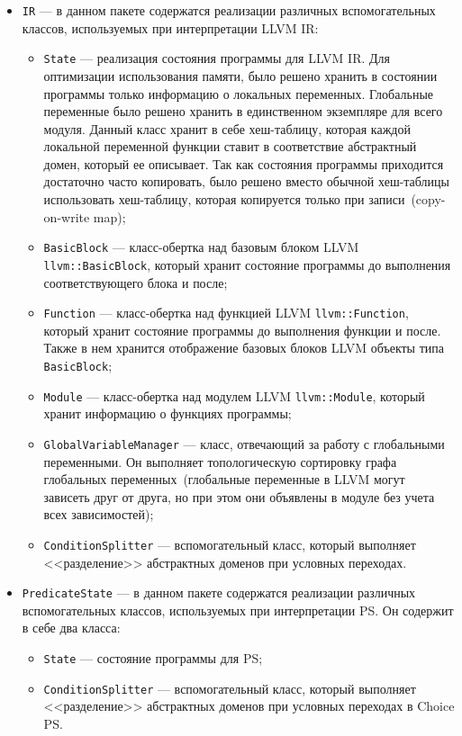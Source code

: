\begin{itemize}
\item \texttt{IR} --- в данном пакете содержатся реализации различных 
вспомогательных классов, используемых при интерпретации LLVM IR:
    \begin{itemize}
    \item \texttt{State} --- реализация состояния программы для LLVM IR. Для 
    оптимизации использования памяти, было решено хранить в состоянии 
    программы только информацию о локальных переменных. Глобальные переменные 
    было решено хранить в единственном экземпляре для всего модуля. Данный 
    класс хранит в себе хеш-таблицу, которая каждой локальной переменной 
    функции ставит в соответствие абстрактный домен, который ее описывает. Так 
    как состояния программы приходится достаточно часто копировать, было решено 
    вместо обычной хеш-таблицы использовать хеш-таблицу, которая копируется 
    только при записи~(copy-on-write map);
    \item \texttt{BasicBlock} --- класс-обертка над базовым блоком LLVM
    \texttt{llvm::BasicBlock}, который хранит состояние программы до
    выполнения соответствующего блока и после;
    \item \texttt{Function} --- класс-обертка над функцией LLVM
    \texttt{llvm::Function}, который хранит состояние программы до 
    выполнения функции и после. Также в нем хранится отображение базовых блоков
    LLVM объекты типа \texttt{BasicBlock};
    \item \texttt{Module} --- класс-обертка над модулем LLVM
    \texttt{llvm::Module}, который хранит информацию о функциях 
    программы;
    \item \texttt{GlobalVariableManager} --- класс, отвечающий за работу с 
    глобальными переменными. Он выполняет топологическую сортировку графа
    глобальных переменных~(глобальные переменные в LLVM могут зависеть друг от
    друга, но при этом они объявлены в модуле без учета всех зависимостей);
    \item \texttt{ConditionSplitter} --- вспомогательный класс, который 
    выполняет <<разделение>> абстрактных доменов при условных переходах.
    \end{itemize}
\item \texttt{PredicateState} --- в данном пакете содержатся реализации 
различных вспомогательных классов, используемых при интерпретации PS. Он 
содержит в себе два класса:
    \begin{itemize}
    \item \texttt{State} --- состояние программы для PS;
    \item \texttt{ConditionSplitter} --- вспомогательный класс, который 
    выполняет <<разделение>> абстрактных доменов при условных переходах в 
    Choice PS.
    \end{itemize}
\end{itemize}


